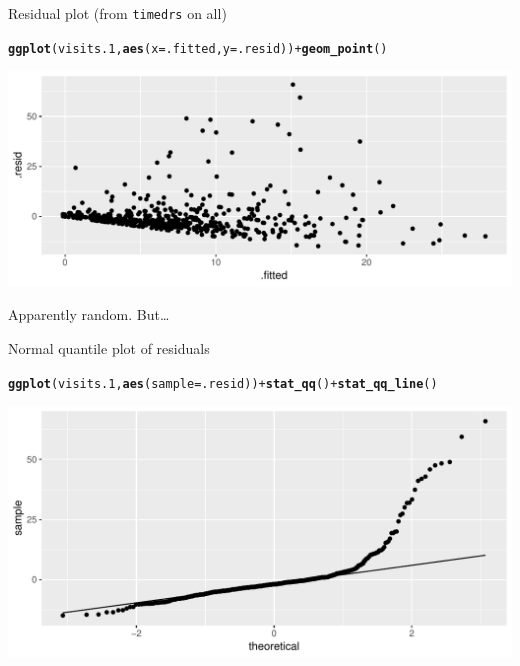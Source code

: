 \documentclass[unknownkeysallowed]{beamer}\usepackage[]{graphicx}\usepackage[]{color}
\makeatletter
\def\maxwidth{ %
  \ifdim\Gin@nat@width>\linewidth
    \linewidth
  \else
    \Gin@nat@width
  \fi
}
\newcommand{\hlopt}[1]{\textcolor[rgb]{0,0,0}{#1}}%
\newcommand{\hlstd}[1]{\textcolor[rgb]{0.345,0.345,0.345}{#1}}%
\newcommand{\hlkwc}[1]{\textcolor[rgb]{0.333,0.667,0.333}{#1}}%
\newcommand{\hlkwd}[1]{\textcolor[rgb]{0.737,0.353,0.396}{\textbf{#1}}}%
\newenvironment{kframe}{%
 \def\at@end@of@kframe{}%
 \ifinner\ifhmode%
  \def\at@end@of@kframe{\end{minipage}}%
  \begin{minipage}{\columnwidth}%
 \fi\fi%
 \def\FrameCommand##1{\hskip\@totalleftmargin \hskip-\fboxsep
 \colorbox{shadecolor}{##1}\hskip-\fboxsep
     \hskip-\linewidth \hskip-\@totalleftmargin \hskip\columnwidth}%
 \MakeFramed {\advance\hsize-\width
   \@totalleftmargin\z@ \linewidth\hsize
   \@setminipage}}%
 {\par\unskip\endMakeFramed%
 \at@end@of@kframe}
\newenvironment{knitrout}{}{} %
\makeatother
\begin{document}
\begin{frame}[fragile]{Residual plot (from \texttt{timedrs} on all)}
 
\begin{knitrout}\small
{}\color{fgcolor}\begin{kframe}
\begin{alltt}
\hlkwd{ggplot}\hlstd{(visits.1,}\hlkwd{aes}\hlstd{(}\hlkwc{x}\hlstd{=.fitted,}\hlkwc{y}\hlstd{=.resid))}\hlopt{+}\hlkwd{geom_point}\hlstd{()}
\end{alltt}
\end{kframe}
\includegraphics[width=\maxwidth]{figure/iffy8-1} 

\end{knitrout}

Apparently random. But\ldots


\end{frame}

\begin{frame}[fragile]{Normal quantile plot of residuals}
  
\begin{knitrout}
\color{fgcolor}\begin{kframe}
\begin{alltt}
\hlkwd{ggplot}\hlstd{(visits.1,} \hlkwd{aes}\hlstd{(}\hlkwc{sample}\hlstd{=.resid))}\hlopt{+}\hlkwd{stat_qq}\hlstd{()}\hlopt{+}\hlkwd{stat_qq_line}\hlstd{()}
\end{alltt}
\end{kframe}
\includegraphics[width=\maxwidth]{figure/unnamed-chunk-29-1} 

\end{knitrout}
  
\end{frame}
\end{document}

